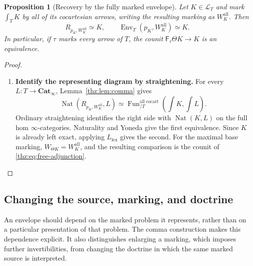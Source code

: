 \documentclass[oneside]{article}
\theoremstyle{plain}
\newtheorem{proposition}[theorem]{Proposition}
\theoremstyle{definition}
\theoremstyle{remark}
\newcommand{\Cat}{\mathbf{Cat}_{\infty}}
\newcommand{\Env}{\operatorname{Env}}
\newcommand{\Fun}{\operatorname{Fun}}
\newcommand{\Nat}{\operatorname{Nat}}
\begin{document}
\begin{proposition}[Recovery by the fully marked envelope]\label{thz:prop:fully-marked}
Let $K\in\mathcal L_T$ and mark $\int_TK$ by all of its cocartesian
arrows, writing the resulting marking as $W_K^{\mathrm{all}}$.  Then
\[
 R_{p_K,W_K^{\mathrm{all}}}\simeq K,
 \qquad
 \Env_T(p_K,W_K^{\mathrm{all}})\simeq K.
\]
In particular, if $\tau$ marks every arrow of $T$, the counit
$\mathsf F_\tau\Theta K\to K$ is an equivalence.
\end{proposition}
\begin{proof}
\leavevmode
\begin{enumerate}
\item \textbf{Identify the representing diagram by straightening.} For every $L:T\to\Cat$, Lemma~\ref{thz:lem:comma} gives
\[
 \Nat(R_{p_K,W_K^{\mathrm{all}}},L)
 \simeq
 \Fun^{\mathrm{all\ cocart}}_{/T}
   (\textstyle\int K,\int L).
\]
Ordinary straightening identifies the right side with $\Nat(K,L)$ on
the full hom $\infty$-categories.  Naturality and Yoneda give the first
equivalence.  Since $K$ is already left exact, applying
$L_{\mathrm{lex}}$ gives the second.  For the maximal base marking,
$W_{\Theta K}=W_K^{\mathrm{all}}$, and the resulting comparison is the
counit of \eqref{thz:eq:free-adjunction}.\qedhere
\end{enumerate}
\end{proof}


\subsection{Changing the source, marking, and doctrine}
\label{subsec:envelope-functoriality}

An envelope should depend on the marked problem it represents, rather
than on a particular presentation of that problem. The comma construction
makes this dependence explicit. It also distinguishes enlarging a marking,
which imposes further invertibilities, from changing the doctrine in which
the same marked source is interpreted.
\end{document}
